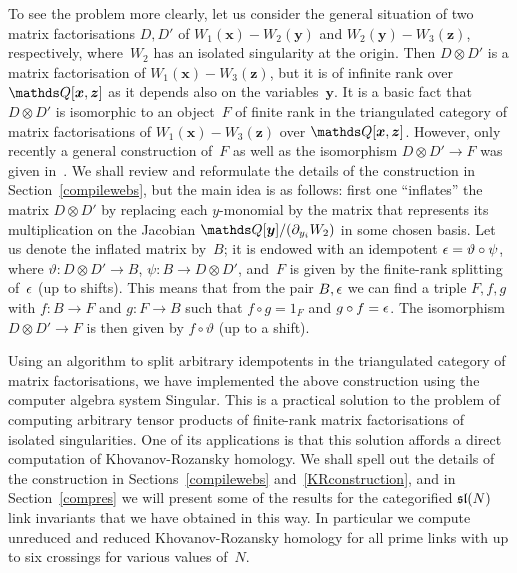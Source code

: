 \documentclass{compositio}
\theoremstyle{definition}
\numberwithin{equation}{section}
\begin{document}
To see the problem more clearly, let us consider the general situation of two matrix factorisations $D,D'$ of $W_{1}(\boldsymbol{x})-W_{2}(\boldsymbol{y})$ and $W_{2}(\boldsymbol{y})-W_{3}(\boldsymbol{z})$, respectively, where~$W_{2}$ has an isolated singularity at the origin. Then $D\otimes D'$ is a matrix factorisation of $W_{1}(\boldsymbol{x})-W_{3}(\boldsymbol{z})$, but it is of infinite rank over $\nQ[\boldsymbol{x},\boldsymbol{z}]$ as it depends also on the variables~$\boldsymbol{y}$. It is a basic fact that $D\otimes D'$ is isomorphic to an object~$F$ of finite rank in the triangulated category of matrix factorisations of $W_{1}(\boldsymbol{x})-W_{3}(\boldsymbol{z})$ over $\nQ[\boldsymbol{x},\boldsymbol{z}]$. However, only recently a general construction of~$F$ as well as the isomorphism $D\otimes D'\longrightarrow F$ was given in~\cite{dm1102.2957}. We shall review and reformulate the details of the construction in Section~\ref{compilewebs}, but the main idea is as follows:  first one ``inflates'' the matrix $D\otimes D'$ by replacing each $y$-monomial by the matrix that represents its multiplication on the Jacobian $\nQ[\boldsymbol{y}]/(\partial_{y_{i}} W_{2})$ in some chosen basis. Let us denote the inflated matrix by~$B$; it is endowed with an idempotent $\epsilon=\vartheta\circ\psi$, where $\vartheta: D\otimes D'\longrightarrow B$, $\psi: B\longrightarrow D\otimes D'$, and~$F$ is given by the finite-rank splitting of~$\epsilon$ (up to shifts). This means that from the pair $B,\epsilon$ we can find a triple $F,f,g$ with $f:B\longrightarrow F$ and $g:F\longrightarrow B$ such that $f\circ g=1_{F}$ and $g\circ f=\epsilon$. The isomorphism $D\otimes D'\longrightarrow F$ is then given by $f\circ\vartheta$ (up to a shift). 

Using an algorithm to split arbitrary idempotents in the triangulated category of matrix factorisations, we have implemented the above construction using the computer algebra system Singular. This is a practical solution to the problem of computing arbitrary tensor products of finite-rank matrix factorisations of isolated singularities. One of its applications is that this solution affords a direct computation of Khovanov-Rozansky homology. We shall spell out the details of the construction in Sections~\ref{compilewebs} and~\ref{KRconstruction}, and in Section~\ref{compres} we will present some of the results for the categorified $\mathfrak{sl}(N)$ link invariants that we have obtained in this way. In particular we compute unreduced and reduced Khovanov-Rozansky homology for all prime links with up to six crossings for various values of~$N$. 
\end{document}
